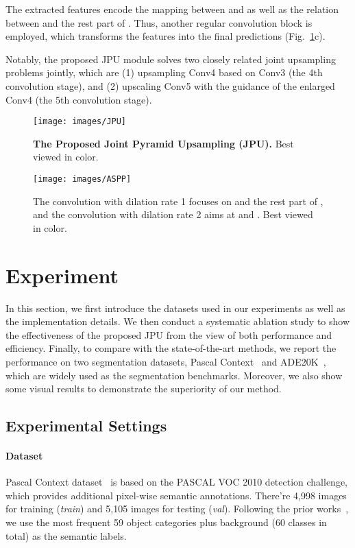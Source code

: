 \documentclass[10pt,twocolumn,letterpaper]{article}
\begin{document}
The extracted features encode the mapping between  and  as well as the relation between  and the rest part of .
Thus, another regular convolution block is employed, which transforms the features into the final predictions (Fig.~\ref{fig:jpu}c).

Notably, the proposed JPU module solves two closely related joint upsampling problems jointly, which are (1) upsampling Conv4 based on Conv3 (the 4th convolution stage), and (2) upscaling Conv5 with the guidance of the enlarged Conv4 (the 5th convolution stage).
\begin{figure} 
\begin{center}
	\texttt{[image: images/JPU]}
\end{center}
	\caption{\textbf{The Proposed Joint Pyramid Upsampling (JPU).} Best viewed in color.}
	\label{fig:jpu}
\end{figure}
\begin{figure} 
\begin{center}
	\texttt{[image: images/ASPP]}
\end{center}
	\caption{The convolution with dilation rate 1 focuses on  and the rest part of , and the convolution with dilation rate 2 aims at  and . Best viewed in color.}
	\label{fig:aspp}
\end{figure}
\section{Experiment}
In this section, we first introduce the datasets used in our experiments as well as the implementation details.
We then conduct a systematic ablation study to show the effectiveness of the proposed JPU from the view of both performance and efficiency.
Finally, to compare with the state-of-the-art methods, we report the performance on two segmentation datasets, Pascal Context~\cite{mottaghi2014role} and ADE20K~\cite{zhou2017scene}, which are widely used as the segmentation benchmarks.
Moreover, we also show some visual results to demonstrate the superiority of our method.
\subsection{Experimental Settings}
\paragraph{Dataset}
Pascal Context dataset~\cite{mottaghi2014role} is based on the PASCAL VOC 2010 detection challenge, which provides additional pixel-wise semantic annotations.
There're 4,998 images for training (\textit{train}) and 5,105 images for testing (\textit{val}).
Following the prior works~\cite{lin2017refinenet,chen2018deeplab,zhang2018context}, we use the most frequent 59 object categories plus background (60 classes in total) as the semantic labels.
\vspace{-1em}
\end{document}
